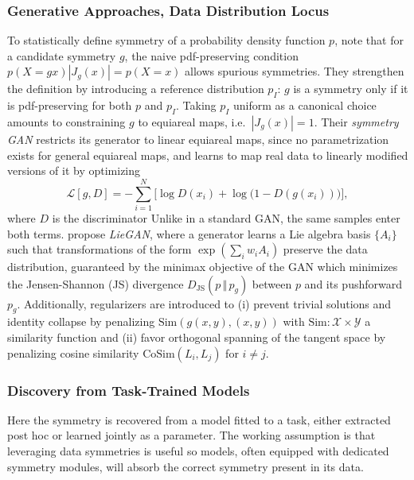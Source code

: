 \documentclass[mathematics,review,submit,moreauthors]{Definitions/mdpi}
\begin{document}
\subsubsection{Generative Approaches, Data Distribution Locus}
To statistically define symmetry of a probability density function $p$, \citet{desai2022prd} note that for a candidate symmetry $g$, the naive pdf-preserving condition $p(X=gx)|J_g(x)|=p(X=x)$ allows spurious symmetries.
They strengthen the definition by introducing a reference distribution $p_I$: $g$ is a symmetry only if it is pdf-preserving for both $p$ and $p_I$.
Taking $p_I$ uniform as a canonical choice amounts to constraining $g$ to equiareal maps, i.e.\ $|J_g(x)|=1$.
Their \emph{symmetry GAN} restricts its generator to linear equiareal maps, since no parametrization exists for general equiareal maps, and learns to map real data to linearly modified versions of it by optimizing
\begin{equation*}
    \mathcal{L}[g,D] = -\sum_{i=1}^{N}\Big[\log D(x_i) + \log\big(1-D(g(x_i))\big)\Big],
\end{equation*}
where $D$ is the discriminator
Unlike in a standard GAN, the same samples enter both terms.
\citet{yang2023p4icml} propose \textit{LieGAN}, where a generator learns a Lie algebra basis $\{A_i\}$ such that transformations of the form $\exp(\sum_i w_i A_i)$ preserve the data distribution, guaranteed by the minimax objective of the GAN which minimizes the Jensen-Shannon (JS) divergence $D_{\text{JS}}(p\,\Vert{}\, p_g)$ between $p$ and its pushforward $p_g$.
Additionally, regularizers are introduced to (i) prevent trivial solutions and identity collapse by penalizing $\mathrm{Sim}(g(x,y), (x,y))$ with $\mathrm{Sim}:\mathcal{X} \times \mathcal{Y}$ a similarity function and (ii) favor orthogonal spanning of the tangent space by penalizing cosine similarity $\mathrm{CoSim}(L_i, L_j)$ for $i\neq j$.


\subsubsection{Discovery from Task-Trained Models}\label{sec:disco-task-trained}
Here the symmetry is recovered from a model fitted to a task, either extracted post hoc or learned jointly as a parameter.
The working assumption is that leveraging data symmetries is useful so models, often equipped with dedicated symmetry modules, will absorb the correct symmetry present in its data.
\end{document}
